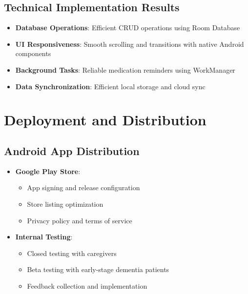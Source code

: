 \section{Technical Implementation Results}
\begin{itemize}
    \item \textbf{Database Operations}: Efficient CRUD operations using Room Database
    \item \textbf{UI Responsiveness}: Smooth scrolling and transitions with native Android components
    \item \textbf{Background Tasks}: Reliable medication reminders using WorkManager
    \item \textbf{Data Synchronization}: Efficient local storage and cloud sync
\end{itemize}

\chapter{Deployment and Distribution}
\section{Android App Distribution}
\begin{itemize}
    \item \textbf{Google Play Store}:
    \begin{itemize}
        \item App signing and release configuration
        \item Store listing optimization
        \item Privacy policy and terms of service
    \end{itemize}
    
    \item \textbf{Internal Testing}:
    \begin{itemize}
        \item Closed testing with caregivers
        \item Beta testing with early-stage dementia patients
        \item Feedback collection and implementation
    \end{itemize}
\end{itemize}

